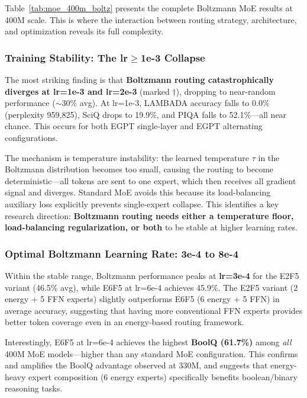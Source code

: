\documentclass[oneside]{article}
\begin{document}
Table~\ref{tab:moe_400m_boltz} presents the complete Boltzmann MoE results at 400M scale. This is where the interaction between routing strategy, architecture, and optimization reveals its full complexity.

\subsubsection{Training Stability: The lr$\geq$1e-3 Collapse}

The most striking finding is that \textbf{Boltzmann routing catastrophically diverges at lr=1e-3 and lr=2e-3} (marked $\dagger$), dropping to near-random performance ($\sim$30\% avg). At lr=1e-3, LAMBADA accuracy falls to 0.0\% (perplexity 959,825), SciQ drops to 19.9\%, and PIQA falls to 52.1\%---all near chance. This occurs for both EGPT single-layer and EGPT alternating configurations.

The mechanism is temperature instability: the learned temperature $\tau$ in the Boltzmann distribution becomes too small, causing the routing to become deterministic---all tokens are sent to one expert, which then receives all gradient signal and diverges. Standard MoE avoids this because its load-balancing auxiliary loss explicitly prevents single-expert collapse. This identifies a key research direction: \textbf{Boltzmann routing needs either a temperature floor, load-balancing regularization, or both} to be stable at higher learning rates.

\subsubsection{Optimal Boltzmann Learning Rate: 3e-4 to 8e-4}

Within the stable range, Boltzmann performance peaks at \textbf{lr=3e-4} for the E2F5 variant (46.5\% avg), while E6F5 at lr=6e-4 achieves 45.9\%. The E2F5 variant (2 energy + 5 FFN experts) slightly outperforms E6F5 (6 energy + 5 FFN) in average accuracy, suggesting that having more conventional FFN experts provides better token coverage even in an energy-based routing framework.

Interestingly, E6F5 at lr=6e-4 achieves the highest \textbf{BoolQ (61.7\%)} among \textit{all} 400M MoE models---higher than any standard MoE configuration. This confirms and amplifies the BoolQ advantage observed at 330M, and suggests that energy-heavy expert composition (6 energy experts) specifically benefits boolean/binary reasoning tasks.
\end{document}
